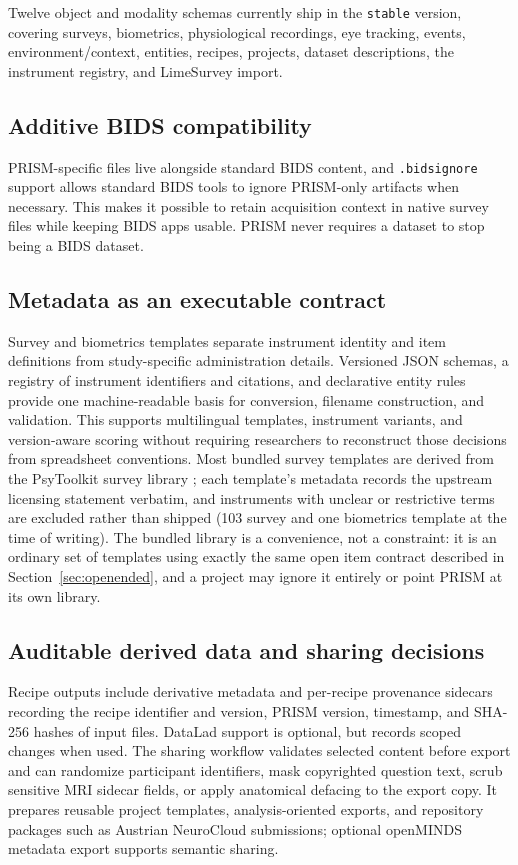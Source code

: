 \documentclass[10pt]{article}
\begin{document}
Twelve object and modality schemas currently ship in the \texttt{stable}
version, covering surveys, biometrics, physiological recordings, eye
tracking, events, environment/context, entities, recipes, projects, dataset
descriptions, the instrument registry, and LimeSurvey import.

\subsection{Additive BIDS compatibility}

PRISM-specific files live alongside standard BIDS content, and
\texttt{.bidsignore} support allows standard BIDS tools to ignore PRISM-only
artifacts when necessary. This makes it possible to retain acquisition
context in native survey files while keeping BIDS apps usable. PRISM never
requires a dataset to stop being a BIDS dataset.

\subsection{Metadata as an executable contract}

Survey and biometrics templates separate instrument identity and item
definitions from study-specific administration details. Versioned JSON
schemas, a registry of instrument identifiers and citations, and declarative
entity rules provide one machine-readable basis for conversion, filename
construction, and validation. This supports multilingual templates,
instrument variants, and version-aware scoring without requiring researchers
to reconstruct those decisions from spreadsheet conventions. Most bundled
survey templates are derived from the PsyToolkit survey library
\citep{stoet2010psytoolkit,stoet2017psytoolkit}; each template's metadata
records the upstream licensing statement verbatim, and instruments with
unclear or restrictive terms are excluded rather than shipped (103 survey
and one biometrics template at the time of writing). The bundled library is
a convenience, not a constraint: it is an ordinary set of templates using
exactly the same open item contract described in
Section~\ref{sec:openended}, and a project may ignore it entirely or point
PRISM at its own library.

\subsection{Auditable derived data and sharing decisions}

Recipe outputs include derivative metadata and per-recipe provenance
sidecars recording the recipe identifier and version, PRISM version,
timestamp, and SHA-256 hashes of input files. DataLad support is optional,
but records scoped changes when used. The sharing workflow validates
selected content before export and can randomize participant identifiers,
mask copyrighted question text, scrub sensitive MRI sidecar fields, or apply
anatomical defacing to the export copy. It prepares reusable project
templates, analysis-oriented exports, and repository packages such as
Austrian NeuroCloud submissions; optional openMINDS metadata export supports
semantic sharing.
\end{document}
